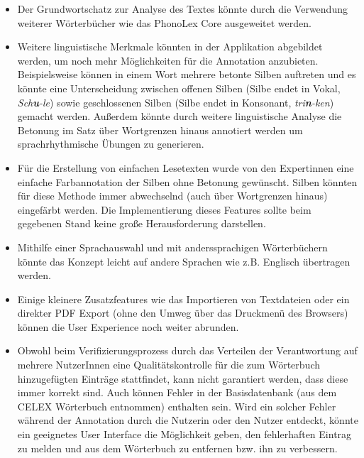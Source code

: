 \begin{itemize}
	\item Der Grundwortschatz zur Analyse des Textes könnte durch die Verwendung weiterer Wörterbücher wie das PhonoLex Core ausgeweitet werden.
	
	\item Weitere linguistische Merkmale könnten in der Applikation abgebildet werden, um noch mehr Möglichkeiten für die Annotation anzubieten. Beispielsweise können in einem Wort mehrere betonte Silben auftreten und es könnte eine Unterscheidung zwischen offenen Silben (Silbe endet in Vokal, \textit{Sch\textbf{u}-le}) sowie geschlossenen Silben (Silbe endet in Konsonant, \textit{tri\textbf{n}-ken}) gemacht werden. Außerdem könnte durch weitere linguistische Analyse die Betonung im Satz über Wortgrenzen hinaus annotiert werden um sprachrhythmische Übungen zu generieren.
	
	\item Für die Erstellung von einfachen Lesetexten wurde von den Expertinnen eine einfache Farbannotation der Silben ohne Betonung gewünscht. Silben könnten für diese Methode immer abwechselnd (auch über Wortgrenzen hinaus) eingefärbt werden. Die Implementierung dieses Features sollte beim gegebenen Stand keine große Herausforderung darstellen.
	
	\item Mithilfe einer Sprachauswahl und mit anderssprachigen Wörterbüchern könnte das Konzept leicht auf andere Sprachen wie z.B. Englisch übertragen werden.
	
	\item Einige kleinere Zusatzfeatures wie das Importieren von Textdateien oder ein direkter PDF Export (ohne den Umweg über das Druckmenü des Browsers) können die User Experience noch weiter abrunden.
	
	\item Obwohl beim Verifizierungsprozess durch das Verteilen der Verantwortung auf mehrere NutzerInnen eine Qualitätskontrolle für die zum Wörterbuch hinzugefügten Einträge stattfindet, kann nicht garantiert werden, dass diese immer korrekt sind. Auch können Fehler in der Basisdatenbank (aus dem CELEX Wörterbuch entnommen) enthalten sein. Wird ein solcher Fehler während der Annotation durch die Nutzerin oder den Nutzer entdeckt, könnte ein geeignetes User Interface die Möglichkeit geben, den fehlerhaften Eintrag zu melden und aus dem Wörterbuch zu entfernen bzw. ihn zu verbessern.
\end{itemize}


